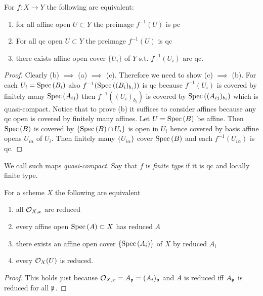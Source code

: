 \documentclass[12pt]{article}
\begin{document}
\begin{lemma}
For $f : X \to Y$ the following are equivalent:
\begin{enumerate}
\item for all affine open $U \subset Y$ the preimage $f^{-1}(U)$ is pc
\item For all qc open $U \subset Y$ the preimage $f^{-1}(U)$ is qc
\item there exists affine open cover $\{ U_i \}$ of $Y$ s.t. $f^{-1}(U_i)$ are qc.
\end{enumerate}
\end{lemma}

\begin{proof}
Clearly (b) $\implies$ (a) $\implies$ (c). Therefore we need to show (c) $\implies$ (b). For each $U_i = \mathrm{Spec}\left( B_i \right)$ also $f^{-1}(\mathrm{Spec}\left( (B_i)_{b_i} \right))$ is qc because $f^{-1}(U_i)$ is covered by finitely many $\mathrm{Spec}\left( A_{ij} \right)$ then $f^{-1}((U_i)_{b_i})$ is covered by $\mathrm{Spec}\left( (A_{ij})_{b_i} \right)$ which is quasi-compact. Notice that to prove (b) it suffices to consider affines because any qc open is covered by finitely many affines. Let $U = \mathrm{Spec}\left( B \right)$ be affine. Then $\mathrm{Spec}\left( B \right)$ is covered by $\{ \mathrm{Spec}\left( B \right) \cap U_i \}$ is open in $U_i$ hence covered by basis affine opens $U_{i\alpha}$ of $U_i$. Then finitely many $\{ U_{i \alpha} \}$ cover $\mathrm{Spec}\left( B \right)$ and each $f^{-1}(U_{i\alpha})$ is qc.
\end{proof}

\begin{defn}
We call such maps \textit{quasi-compact}. Say that $f$ is \textit{finite type} if it is qc and locally finite type.
\end{defn}

\begin{prop}
For a scheme $X$ the following are equivalent
\begin{enumerate}
\item all $\mathcal{O}_{X, x}$ are reduced
\item every affine open $\mathrm{Spec}\left( A \right) \subset X$ has reduced $A$
\item there exists an affine open cover $\{ \mathrm{Spec}\left( A_i \right) \}$ of $X$ by reduced $A_i$
\item every $\mathcal{O}_{X}(U)$ is reduced.
\end{enumerate}
\end{prop}

\begin{proof}
This holds just because $\mathcal{O}_{X, x} = A_{\mathfrak{p}} = (A_i)_{\mathfrak{p}}$ and $A$ is reduced iff $A_{\mathfrak{p}}$ is reduced for all $\mathfrak{p}$.
\end{proof}
\end{document}
